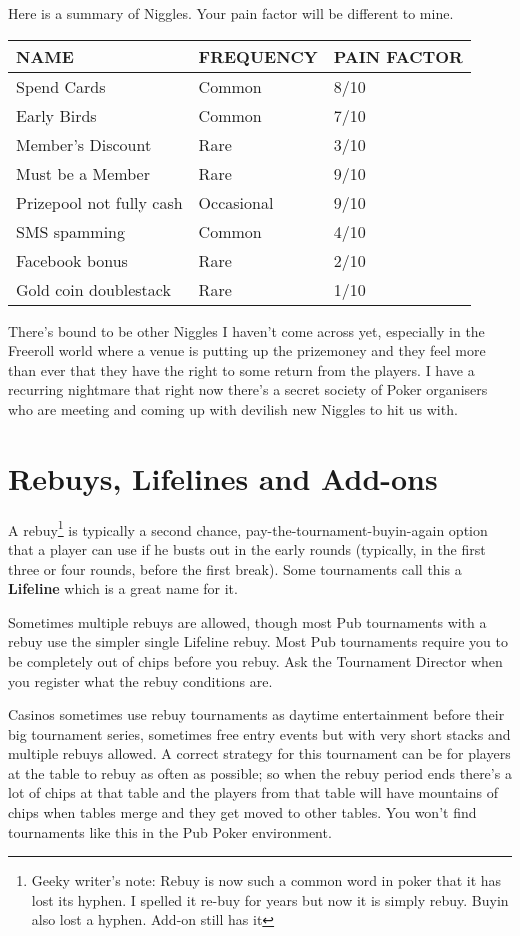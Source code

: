 Here is a summary of Niggles. Your pain factor will be different to
mine.

\begin{tabular}{|l|l|l|} \hline
NAME    &  FREQUENCY  & PAIN FACTOR\\ \hline
Spend Cards & Common  & 8/10\\ \hline
Early Birds & Common & 7/10\\ \hline
Member's Discount & Rare  & 3/10\\ \hline
Must be a Member & Rare  & 9/10\\ \hline
Prizepool not fully cash & Occasional & 9/10\\ \hline
SMS spamming & Common & 4/10\\ \hline
Facebook bonus & Rare & 2/10 \\ \hline
Gold coin doublestack & Rare & 1/10 \\ \hline
\end{tabular}

There's bound to be other Niggles I haven't come across yet,
especially in the Freeroll world where a venue is putting up the
prizemoney and they feel more than ever that they have the right
to some return from the players. I have a recurring
nightmare that right now there's a secret society of Poker organisers
who are meeting and coming up with devilish new Niggles to hit us with.

\section{Rebuys, Lifelines and Add-ons}

A rebuy\footnote{Geeky writer's note: Rebuy is now such a common word in
poker that it has lost its hyphen. I spelled it re-buy for years but
now it is simply rebuy. Buyin also lost a hyphen.  Add-on still has it}
is typically a second chance, pay-the-tournament-buyin-again
option that a player can use if he busts out in the early rounds
(typically, in the first three or four rounds, before the first
break). Some tournaments call this a \textbf{Lifeline} which is a
great name for it.

Sometimes multiple rebuys are allowed, though most Pub tournaments
with a rebuy use the simpler single Lifeline rebuy. Most Pub
tournaments require you to be completely out of chips before you
rebuy. Ask the Tournament Director when you register what
the rebuy conditions are.

Casinos sometimes use rebuy tournaments as daytime entertainment
before their big tournament series, sometimes free entry events
but with very short stacks and multiple rebuys allowed. A correct
strategy for this tournament can be for players at the table
to rebuy as often as possible; so when the rebuy period ends there's
a lot of chips at that table and the players from that table will
have mountains of chips when tables merge and they get moved to
other tables. You won't find tournaments like this in the Pub Poker
environment.

